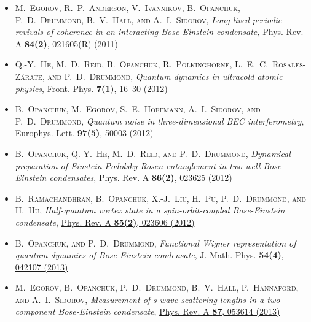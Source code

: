 
\begin{itemize}
\item[\hfleuron] \textsc{M.~Egorov, R.~P.~Anderson, V.~Ivannikov, B.~Opanchuk, P.~D.~Drummond, B.~V.~Hall, \textnormal{and} A.~I.~Sidorov}, \textit{Long-lived periodic revivals of coherence in an interacting Bose-Einstein condensate,} \href{http://dx.doi.org/doi:10.1103/PhysRevA.84.021605}{Phys. Rev. A \textbf{84(2)}, 021605(R) (2011)}

\item[\hfleuron] \textsc{Q.-Y.~He, M.~D.~Reid, B.~Opanchuk, R.~Polkinghorne, L.~E.~C.~Rosales-Z\'arate, \textnormal{and} P.~D.~Drummond}, \textit{Quantum dynamics in ultracold atomic physics}, \href{http://dx.doi.org/doi:10.1007/s11467-011-0232-x}{Front. Phys. \textbf{7(1)}, 16--30 (2012)}

\item[\hfleuron] \textsc{B.~Opanchuk, M.~Egorov, S.~E.~Hoffmann, A.~I.~Sidorov, \textnormal{and} P.~D.~Drummond}, \textit{Quantum noise in three-dimensional BEC interferometry}, \href{http://dx.doi.org/doi:10.1209/0295-5075/97/50003}{Europhys. Lett. \textbf{97(5)}, 50003 (2012)}

\item[\hfleuron] \textsc{B.~Opanchuk, Q.-Y.~He, M.~D.~Reid, \textnormal{and} P.~D.~Drummond}, \textit{Dynamical preparation of Einstein-Podolsky-Rosen entanglement in two-well Bose-Einstein condensates}, \href{http://dx.doi.org/doi:10.1103/PhysRevA.86.023625}{Phys. Rev. A \textbf{86(2)}, 023625 (2012)}

\item[\hfleuron] \textsc{B.~Ramachandhran, B.~Opanchuk, X.-J.~Liu, H.~Pu, P.~D.~Drummond, \textnormal{and} H.~Hu}, \textit{Half-quantum vortex state in a spin-orbit-coupled Bose-Einstein condensate}, \href{http://dx.doi.org/doi:10.1103/PhysRevA.85.023606}{Phys. Rev. A \textbf{85(2)}, 023606 (2012)}

\item[\hfleuron] \textsc{B.~Opanchuk, \textnormal{and} P.~D.~Drummond}, \textit{Functional Wigner representation of quantum dynamics of Bose-Einstein condensate}, \href{http://dx.doi.org/doi:10.1063/1.4801781}{J. Math. Phys. \textbf{54(4)}, 042107 (2013)}

\item[\hfleuron] \textsc{M.~Egorov, B.~Opanchuk, P.~D.~Drummond, B.~V.~Hall, P.~Hannaford, \textnormal{and} A.~I.~Sidorov}, \textit{Measurement of s-wave scattering lengths in a two-component Bose-Einstein condensate}, \href{http://dx.doi.org/doi:10.1103/PhysRevA.87.053614}{Phys. Rev. A \textbf{87}, 053614 (2013)}


\end{itemize}

